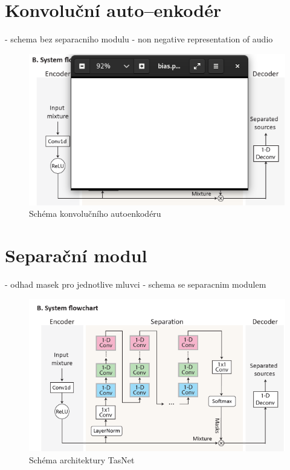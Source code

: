 \section{Konvoluční auto--enkodér}

- schema bez separacniho modulu
- non negative representation of audio
\begin{figure}[H]
    \centering
    \includegraphics[scale=0.5]{obrazky-figures/tasnet-autoencoder.png}
    \caption{\label{fig:tasnet-autoencoder}Schéma konvolučního autoenkodéru}
\end{figure}


\section{Separační modul}
- odhad masek pro jednotlive mluvci
- schema se separacnim modulem
\begin{figure}[H]
    \centering
    \includegraphics[scale=0.6]{obrazky-figures/tasnet-architecture.png}
    \caption{\label{fig:tasnet-modul}Schéma architektury TasNet}
\end{figure}



